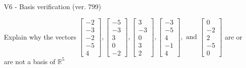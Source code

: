 \begin{exercise}
  \begin{exerciseTitle}V6 - Basis verification (ver. 799)\end{exerciseTitle}
  \begin{exerciseStatement}
    Explain why the vectors \(\left[\begin{array}{r}
-2 \\
-3 \\
-2 \\
-5 \\
4
\end{array}\right] , \left[\begin{array}{r}
-5 \\
-3 \\
3 \\
0 \\
-2
\end{array}\right] , \left[\begin{array}{r}
3 \\
-3 \\
0 \\
3 \\
2
\end{array}\right] , \left[\begin{array}{r}
-3 \\
-5 \\
4 \\
-1 \\
4
\end{array}\right] , \text{ and } \left[\begin{array}{r}
0 \\
-2 \\
2 \\
-5 \\
0
\end{array}\right]\) are or are not a basis of \(\mathbb{R}^5\)	



\end{exerciseStatement}
\end{exercise}
